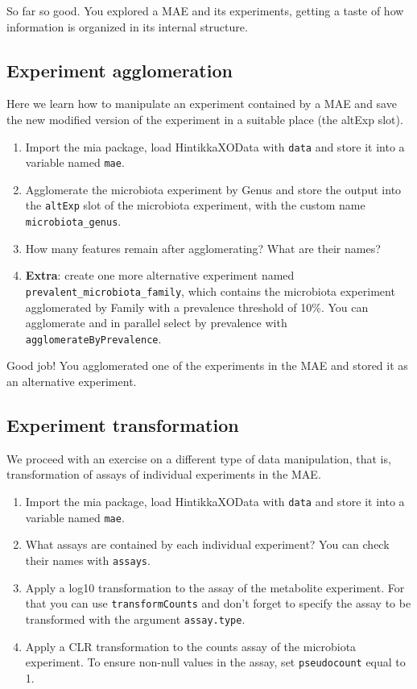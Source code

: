 \documentclass[
]{book}
\providecommand{\tightlist}{%
  \setlength{\itemsep}{0pt}\setlength{\parskip}{0pt}}
\begin{document}
So far so good. You explored a MAE and its experiments, getting a taste of how
information is organized in its internal structure.

\hypertarget{experiment-agglomeration}{%
\subsection{Experiment agglomeration}\label{experiment-agglomeration}}

Here we learn how to manipulate an experiment contained by a MAE and save the
new modified version of the experiment in a suitable place (the altExp slot).

\begin{enumerate}
\def\labelenumi{\arabic{enumi}.}
\tightlist
\item
  Import the mia package, load HintikkaXOData with \texttt{data} and store it into a
  variable named \texttt{mae}.
\item
  Agglomerate the microbiota experiment by Genus and store the output into the
  \texttt{altExp} slot of the microbiota experiment, with the custom name
  \texttt{microbiota\_genus}.
\item
  How many features remain after agglomerating? What are their names?
\item
  \textbf{Extra}: create one more alternative experiment named
  \texttt{prevalent\_microbiota\_family}, which contains the microbiota experiment
  agglomerated by Family with a prevalence threshold of 10\%. You can
  agglomerate and in parallel select by prevalence with
  \texttt{agglomerateByPrevalence}.
\end{enumerate}

Good job! You agglomerated one of the experiments in the MAE and stored it as
an alternative experiment.

\hypertarget{experiment-transformation}{%
\subsection{Experiment transformation}\label{experiment-transformation}}

We proceed with an exercise on a different type of data manipulation, that is,
transformation of assays of individual experiments in the MAE.

\begin{enumerate}
\def\labelenumi{\arabic{enumi}.}
\tightlist
\item
  Import the mia package, load HintikkaXOData with \texttt{data} and store it into a
  variable named \texttt{mae}.
\item
  What assays are contained by each individual experiment? You can check their
  names with \texttt{assays}.
\item
  Apply a log10 transformation to the assay of the metabolite experiment.
  For that you can use \texttt{transformCounts} and don't forget to specify the assay
  to be transformed with the argument \texttt{assay.type}.
\item
  Apply a CLR transformation to the counts assay of the microbiota experiment.
  To ensure non-null values in the assay, set \texttt{pseudocount} equal to 1.
\end{enumerate}
\end{document}
